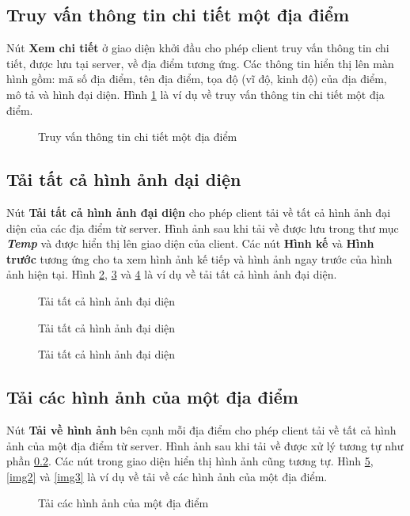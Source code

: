 \subsection{Truy vấn thông tin chi tiết một địa điểm}
Nút \textbf{Xem chi tiết} ở giao diện khởi đầu cho phép client truy vấn thông tin chi tiết, được lưu tại server, về địa điểm tương ứng. Các thông tin hiển thị lên màn hình gồm: mã số địa điểm, tên địa điểm, tọa độ (vĩ độ, kinh độ) của địa điểm, mô tả và hình đại diện. Hình \ref{query1} là ví dụ về truy vấn thông tin chi tiết một địa điểm.
\begin{figure}[H]
\caption{Truy vấn thông tin chi tiết một địa điểm}
\label{query1}
\end{figure}

\subsection{Tải tất cả hình ảnh dại diện}
\label{down_all_avt}
Nút \textbf{Tải tất cả hình ảnh đại diện} cho phép client tải về tất cả hình ảnh đại diện của các địa điểm từ server. Hình ảnh sau khi tải về được lưu trong thư mục \textbf{\textit{Temp}} và được hiển thị lên giao diện của client. Các nút \textbf{Hình kế} và \textbf{Hình trước} tương ứng cho ta xem hình ảnh kế tiếp và hình ảnh ngay trước của hình ảnh hiện tại. Hình \ref{all1}, \ref{all2} và \ref{all3} là ví dụ về tải tất cả hình ảnh đại diện.
\begin{figure}[H]
\caption{Tải tất cả hình ảnh đại diện}
\label{all1}
\end{figure}

\begin{figure}[H]
\caption{Tải tất cả hình ảnh đại diện}
\label{all2}
\end{figure}

\begin{figure}[H]
\caption{Tải tất cả hình ảnh đại diện}
\label{all3}
\end{figure}

\subsection{Tải các hình ảnh của một địa điểm}
Nút \textbf{Tải về hình ảnh} bên cạnh mỗi địa điểm cho phép client tải về tất cả hình ảnh của một địa điểm từ server. Hình ảnh sau khi tải về được xử lý tương tự như phần \ref{down_all_avt}. Các nút trong giao diện hiển thị hình ảnh cũng tương tự. Hình \ref{img1}, \ref{img2} và \ref{img3} là ví dụ về tải về các hình ảnh của một địa điểm.
\begin{figure}[H]
\caption{Tải các hình ảnh của một địa điểm}
\label{img1}
\end{figure}

